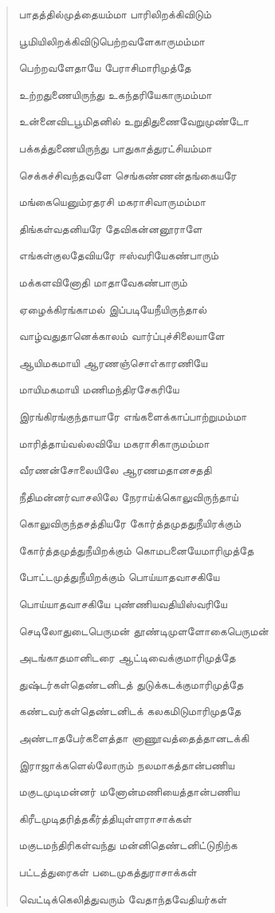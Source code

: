 \documentclass{article}
\begin{document}
\begin{quotation}
{பாதத்தில்முத்தையம்மா பாரிலிறக்கிவிடும்

பூமியிலிறக்கிவிடுபெற்றவளேகாருமம்மா

பெற்றவளேதாயே பேராசிமாரிமுத்தே

உற்றதுணையிருந்து உகந்தரியேகாருமம்மா

உன்னைவிடபூமிதனில் உறுதிதுணைவேறுமுண்டோ

பக்கத்துணையிருந்து பாதுகாத்துரட்சியம்மா

செக்கச்சிவந்தவளே செங்கண்ணன்தங்கையரே

மங்கையெனும்ரதரசி மகராசிவாருமம்மா

திங்கள்வதனியரே தேவிகன்னனூராளே

எங்கள்குலதேவியரே ஈஸ்வரியேகண்பாரும்

மக்களவினோதி மாதாவேகண்பாரும்

ஏழைக்கிரங்காமல் இப்படியேநீயிருந்தால்

வாழ்வதுதானெக்காலம் வார்ப்புச்சிலையாளே

ஆயிமகமாயி ஆரணஞ்சொஎ்காரணியே

மாயிமகமாயி மணிமந்திரசேகரியே

இரங்கிரங்குந்தாயாரே எங்களைக்காப்பாற்றுமம்மா

மாரித்தாய்வல்லவியே மகராசிகாருமம்மா

வீரணன்சோலையிலே ஆரணமதானசததி

நீதிமன்னர்வாசலிலே நேராய்க்கொலுவிருந்தாய்

கொலுவிருந்தசத்தியரே கோர்த்தமுததுநீயிரக்கும்

கோர்த்தமுத்துநீயிறக்கும் கொமபனையேமாரிமுத்தே

போட்டமுத்துநீயிறக்கும் பொய்யாதவாசகியே

பொய்யாதவாசகியே புண்ணியவதியிஸ்வரியே

செடிலோதுடைபெருமன் தூண்டிமுளளோகைபெருமன்

அடங்காதமானிடரை ஆட்டிவைக்குமாரிமுத்தே

துஷ்டர்கள்தெண்டனிடத் துடுக்கடக்குமாரிமுத்தே

கண்டவர்கள்தெண்டனிடக் கலகமிடுமாரிமுததே

அண்டாதபேர்களைத்தா னாணூவத்தைத்தானடக்கி

இராஜாக்களெல்லோரும் நலமாகத்தான்பணிய

மகுடமுடிமன்னர் மனோன்மணியைத்தான்பணிய

கிரீடமுடிதரித்தகீர்த்தியுள்ளராசாக்கள்

மகுடமந்திரிகள்வந்து மன்னிதெண்டனிட்டுநிற்க

பட்டத்துரைகள் படைமுகத்துராசாக்கள்

வெட்டிக்கெலித்துவரும் வேதாந்தவேதியர்கள்

}
\end{quotation}
\end{document}
